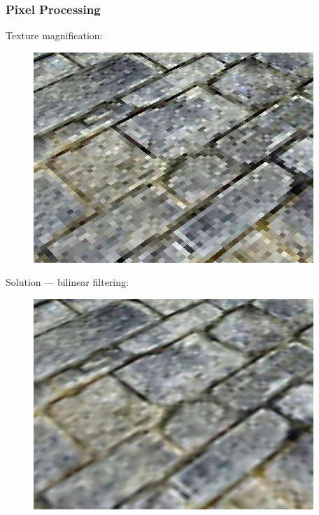 \documentclass[ignorenonframetext,handout,english]{beamer}
\begin{document}
\frame
{
	\frametitle{Pixel Processing}
	{
		Texture magnification:

		\begin{figure}
		\centering
		\includegraphics[scale=0.25]{sampling_point.png}
		\end{figure}

		\pause

		Solution --- bilinear filtering:

		\begin{figure}
		\centering
		\includegraphics[scale=0.25]{sampling_bilinear.png}
		\end{figure}
	}
}
\end{document}
